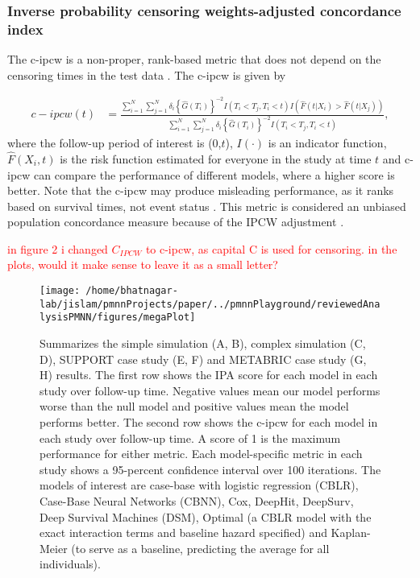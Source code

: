 \documentclass[AMA,STIX1COL,]{WileyNJD-v2}
\newcommand{\srb}[1]{\textsf{\textcolor{red}{#1}}}
\begin{document}
\hypertarget{inverse-probability-censoring-weights-adjusted-concordance-index}{%
\subsubsection{Inverse probability censoring weights-adjusted
concordance
index}\label{inverse-probability-censoring-weights-adjusted-concordance-index}}

The c-ipcw is a non-proper, rank-based metric that does not depend on
the censoring times in the test data \citep{uno2011}. The c-ipcw is
given by

\begin{align} \label{eq:cidx}
c-ipcw(t) &= \frac{\sum^{N}_{i=1}\sum^{N}_{j=1}\delta_{i}\left\{\widehat{G}(T_{i})\right\}^{-2} I(T_{i}<T_{j},T_{i}<t) I\left(\widehat{F}(t|X_{i})>\widehat{F}(t|X_{j})\right)}{\sum^{N}_{i=1}\sum^{N}_{j=1}\delta_{i}\left\{\widehat{G}(T_{i})\right\}^{-2} I(T_{i}<T_{j},T_{i}<t)},
\end{align} where the follow-up period of interest is (0,\(t\)),
\(I(\cdot)\) is an indicator function, \(\widehat{F}(X_{i},t)\) is the
risk function estimated for everyone in the study at time \(t\) and
c-ipcw can compare the performance of different models, where a higher
score is better. Note that the c-ipcw may produce misleading
performance, as it ranks based on survival times, not event status
\citep{cindexfails2019}. This metric is considered an unbiased
population concordance measure because of the IPCW adjustment
\citep{uno2011}.

\srb{in figure 2 i changed $C_{IPCW}$ to c-ipcw, as capital C is used for censoring. in the plots, would it make sense to leave it as a small letter?}

\begin{figure}

{\centering \texttt{[image: /home/bhatnagar-lab/jislam/pmnnProjects/paper/../pmnnPlayground/reviewedAnalysisPMNN/figures/megaPlot]} 

}

\caption{Summarizes the simple simulation (A, B), complex simulation (C, D), SUPPORT case study (E, F) and METABRIC case study (G, H) results. The first row shows the IPA score for each model in each study over follow-up time. Negative values mean our model performs worse than the null model and positive values mean the model performs better. The second row shows the c-ipcw for each model in each study over follow-up time. A score of 1 is the maximum performance for either metric. Each model-specific metric in each study shows a 95-percent confidence interval over 100 iterations. The models of interest are case-base with logistic regression (CBLR), Case-Base Neural Networks (CBNN), Cox, DeepHit, DeepSurv, Deep Survival Machines (DSM), Optimal (a CBLR model with the exact interaction terms and baseline hazard specified) and Kaplan-Meier (to serve as a baseline, predicting the average for all individuals).}\label{fig:megaPlot}
\end{figure}
\end{document}
